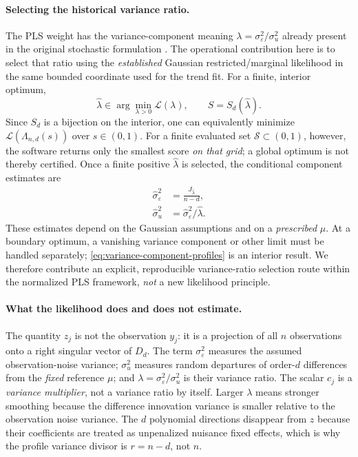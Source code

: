 \paragraph{Selecting the historical variance ratio.}
The PLS weight has the variance-component meaning
$\lambda=\sigma_\varepsilon^2/\sigma_u^2$
already present in the original stochastic
formulation \citep{guerrero2007,cortes2017}.
The operational contribution here is to select
that ratio using the \emph{established}
Gaussian restricted/marginal likelihood
in the same bounded coordinate used for the
trend fit. For a finite, interior optimum,
\begin{equation}\label{eq:variance-ratio-selection}
\widehat\lambda\in\arg\min_{\lambda>0}
\mathcal L(\lambda),\qquad
\widehat S=S_d(\widehat\lambda).
\end{equation}
Since $S_d$ is a bijection on the interior,
one can equivalently minimize
$\mathcal L(\Lambda_{n,d}(s))$ over
$s\in(0,1)$. For a finite evaluated set
$\mathcal S\subset(0,1)$, however, the
software returns only the smallest score
\emph{on that grid}; a global optimum is
not thereby certified. Once a finite positive
$\widehat\lambda$ is selected, the
conditional component estimates are
\begin{equation}\label{eq:variance-component-profiles}
\begin{aligned}
\widehat{\sigma}_\varepsilon^2
&=\frac{J_{\widehat\lambda}}{n-d},\\
\widehat{\sigma}_u^2
&=\widehat{\sigma}_\varepsilon^2/
\widehat\lambda.
\end{aligned}
\end{equation}
These estimates depend on the Gaussian
assumptions and on a \emph{prescribed} $\mu$.
At a boundary optimum, a vanishing variance
component or other limit must be handled
separately; \eqref{eq:variance-component-profiles}
is an interior result. We therefore
contribute an explicit, reproducible
variance-ratio selection route within the
normalized PLS framework, \emph{not} a
new likelihood principle.

\paragraph{What the likelihood does and does not estimate.}
The quantity $z_j$ is not the observation $y_j$:
it is a projection of all $n$ observations onto
a right singular vector of $D_d$. The term
$\sigma_\varepsilon^2$ measures the assumed
observation-noise variance; $\sigma_u^2$ measures
random departures of order-$d$ differences from
the \emph{fixed} reference $\mu$; and
$\lambda=\sigma_\varepsilon^2/\sigma_u^2$
is their variance ratio. The scalar $c_j$
is a \emph{variance multiplier}, not a
variance ratio by itself. Larger $\lambda$
means stronger smoothing because the difference
innovation variance is smaller relative to
the observation noise variance. The $d$
polynomial directions disappear from $z$
because their coefficients are treated as
unpenalized nuisance fixed effects, which
is why the profile variance divisor is
$r=n-d$, not $n$.

